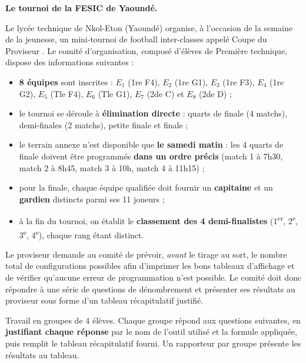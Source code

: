 \documentclass[11pt]{article}
\newcounter{popsec}
\newcounter{popsub}
\newcommand{\courssub}[1]{%
  \stepcounter{popsub}%
  \par\vspace{9pt}\noindent{\popxbold\fontsize{11.5}{13}\selectfont\color{popink}{\color{poporange}\thepopsec.\thepopsub}\hspace{6pt}#1}\par\nopagebreak\vspace{4pt}
}
\begin{document}
\textbf{Le tournoi de la FESIC de Yaoundé.}\par
Le lycée technique de Nkol-Eton (Yaoundé) organise, à l'occasion de la semaine de la jeunesse, un mini-tournoi de football inter-classes appelé \og Coupe du Proviseur \fg. Le comité d'organisation, composé d'élèves de Première technique, dispose des informations suivantes :
\begin{itemize}
\item \textbf{8 équipes} sont inscrites : $E_1$ (1re F4), $E_2$ (1re G1), $E_3$ (1re F3), $E_4$ (1re G2), $E_5$ (Tle F4), $E_6$ (Tle G1), $E_7$ (2de C) et $E_8$ (2de D) ;
\item le tournoi se déroule à \textbf{élimination directe} : quarts de finale (4 matchs), demi-finales (2 matchs), petite finale et finale ;
\item le terrain annexe n'est disponible que \textbf{le samedi matin} : les 4 quarts de finale doivent être programmés \textbf{dans un ordre précis} (match 1 à 7h30, match 2 à 8h45, match 3 à 10h, match 4 à 11h15) ;
\item pour la finale, chaque équipe qualifiée doit fournir un \textbf{capitaine} et un \textbf{gardien} distincts parmi ses 11 joueurs ;
\item à la fin du tournoi, on établit le \textbf{classement des 4 demi-finalistes} (1\textsuperscript{er}, 2\textsuperscript{e}, 3\textsuperscript{e}, 4\textsuperscript{e}), chaque rang étant distinct.
\end{itemize}
Le proviseur demande au comité de prévoir, \emph{avant} le tirage au sort, le nombre total de configurations possibles afin d'imprimer les bons tableaux d'affichage et de vérifier qu'aucune erreur de programmation n'est possible. Le comité doit donc répondre à une série de questions de dénombrement et présenter ses résultats au proviseur sous forme d'un tableau récapitulatif justifié.

\courssub{Consignes}

Travail en groupes de 4 élèves. Chaque groupe répond aux questions suivantes, en \textbf{justifiant chaque réponse} par le nom de l'outil utilisé et la formule appliquée, puis remplit le tableau récapitulatif fourni. Un rapporteur par groupe présente les résultats au tableau.
\end{document}
